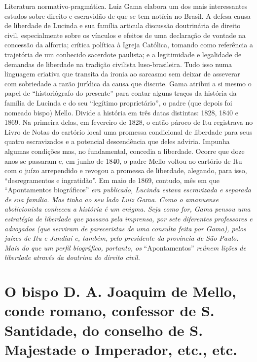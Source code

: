 \begin{didascalia}
Literatura normativo-pragmática. Luiz Gama elabora um dos mais
interessantes estudos sobre direito e escravidão de que se tem notícia
no Brasil. A defesa causa de liberdade de Lucinda e sua família articula
discussão doutrinária de direito civil, especialmente sobre os vínculos
e efeitos de uma declaração de vontade na concessão da alforria; crítica
política à Igreja Católica, tomando como referência a trajetória de um
conhecido sacerdote paulista; e a legitimidade e legalidade de demandas
de liberdade na tradição civilista luso-brasileira. Tudo isso numa
linguagem criativa que transita da ironia ao sarcasmo sem deixar de
asseverar com sobriedade a razão jurídica da causa que discute. Gama
atribui a si mesmo o papel de ``historiógrafo do presente'' para contar
alguns traços da história da família de Lucinda e do seu ``legítimo
proprietário'', o padre (que depois foi nomeado bispo) Mello. Divide a
história em três datas distintas: 1828, 1840 e 1869. Na primeira delas,
em fevereiro de 1828, o então pároco de Itu registrava no Livro de Notas
do cartório local uma promessa condicional de liberdade para seus quatro
escravizados e a potencial descendência que deles adviria. Impunha
algumas condições mas, no fundamental, concedia a liberdade. Ocorre que
doze anos se passaram e, em junho de 1840, o padre Mello voltou ao
cartório de Itu com o juízo arrependido e revogou a promessa de
liberdade, alegando, para isso, ``desregramentos e ingratidão''. Em maio
de 1869, contudo, mês em que ``Apontamentos biográficos'' \emph{era
publicado, Lucinda estava escravizada e separada de sua família. Mas
tinha ao seu lado Luiz Gama. Como o amanuense abolicionista conheceu a
história é um enigma. Seja como for, Gama pensou uma estratégia de
liberdade que passava pela imprensa, por sete diferentes professores e
advogados (que serviram de pareceristas de uma consulta feita por Gama),
pelos juízes de Itu e Jundiaí e, também, pelo presidente da província de
São Paulo. Mais do que um perfil biográfico, portanto, os}
``Apontamentos'' \emph{reúnem lições de liberdade através da doutrina do
direito civil.}
\end{didascalia}



\section{O bispo D. A. Joaquim de Mello, conde romano, confessor de
S.\,Santidade, do conselho de S.\,Majestade o Imperador, etc., etc.}

